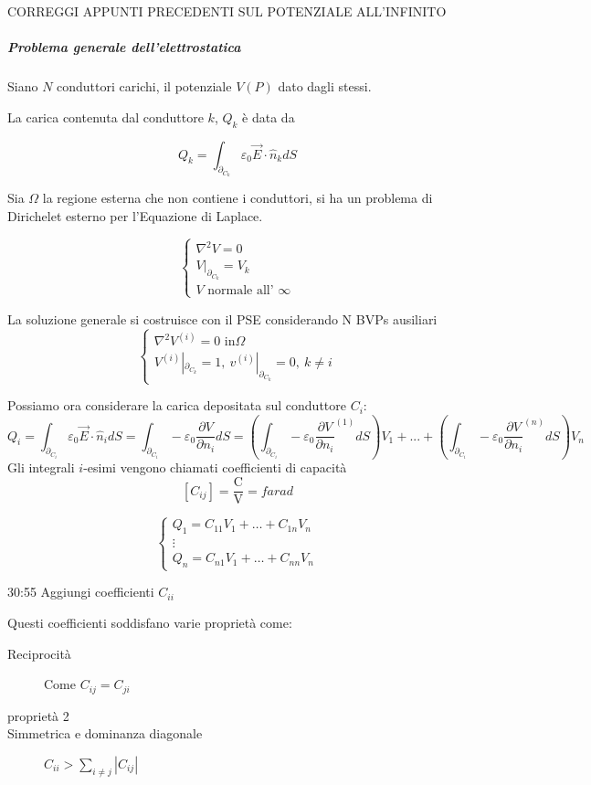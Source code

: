CORREGGI APPUNTI PRECEDENTI SUL POTENZIALE ALL'INFINITO

\subparagraph{Problema generale dell'elettrostatica}

Siano $N$ conduttori carichi, il potenziale $V(P)$ dato dagli stessi.

La carica contenuta dal conduttore $k$, $Q_k$ è data da

$$
Q_k = \int_{\partial_{C_k}} \varepsilon_0 \vec{E}\cdot\hat{n}_k dS
$$

Sia $\Omega$ la regione esterna che non contiene i conduttori, si ha un problema di Dirichelet
esterno per l'Equazione di Laplace.

$$
\begin{cases}
\nabla^2 V = 0\\
V|_{\partial_{C_k}} = V_k \\
V \text{ normale all' } \infty
\end{cases}
$$

La soluzione generale si costruisce con il PSE considerando N BVPs ausiliari
$$
\begin{cases}
\nabla^2 V^{(i)} = 0 \text{ in} \Omega\\
V^{(i)}|_{\partial_{C_k}} = 1,\ v^{(i)}|_{\partial_{C_k}} = 0,\ k \neq i
\end{cases}
$$

Possiamo ora considerare la carica depositata sul conduttore $C_i$:
$$
Q_i = \int_{\partial_{C_i}} \varepsilon_0 \vec{E} \cdot \hat{n}_i dS = \int_{\partial_{C_i}} -\varepsilon_0 \frac{\partial V}{\partial n_i} dS = \left(\int_{\partial_{C_i}} - \varepsilon_0 \frac{\partial V}{\partial n_i}^{(1)} dS\right)V_1 + ... + \left(\int_{\partial_{C_i}} - \varepsilon_0 \frac{\partial V}{\partial n_i}^{(n)} dS\right)V_n
$$
Gli integrali $i$-esimi vengono chiamati coefficienti di capacità
$$
[C_{ij}] = \frac{\si{\coulomb}}{\si{\volt}} = \si{farad}
$$

$$
\begin{cases}
Q_1 = C_{11}V_1 + \ldots + C_{1n}V_n \\
\vdots \\
Q_n = C_{n1}V_1 + \ldots + C_{nn}V_n
\end{cases}
$$

30:55 Aggiungi coefficienti $C_{ii}$

Questi coefficienti soddisfano varie proprietà come:

\begin{description}
 \item[Reciprocità] Come $C_{ij} = C_{ji} $
 \item[proprietà 2]
 \item[Simmetrica e dominanza diagonale] $C_{ii} > \sum_{i\neq j}|C_{ij}|$
\end{description}

